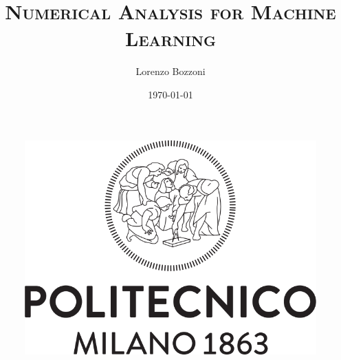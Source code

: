 \documentclass{article}
\title{\textsc{Numerical Analysis for Machine Learning}}
\author{Lorenzo Bozzoni}
\date{\today}
\begin{document}
\begin{figure}[H]
  \centering
  \includegraphics[scale=0.3]{../images/LogoPolimi.png}
\end{figure}
\maketitle
\newpage
\tableofcontents



















\end{document}
